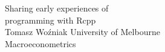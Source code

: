 \documentclass[notes,blackandwhite,mathsans]{beamer}
\begin{document}
\selectfont
{}













{
\begin{frame}

{\Large\color{black}Sharing early experiences of}\\ [0.5ex]
{\Large\color{black}programming with Rcpp}\\ [27ex]

Tomasz Wo\'zniak {\color{lightgray}University of Melbourne}\\[1ex]

{Macroeconometrics} {\color{lightgray}}\\

\end{frame}
}
\end{document}
